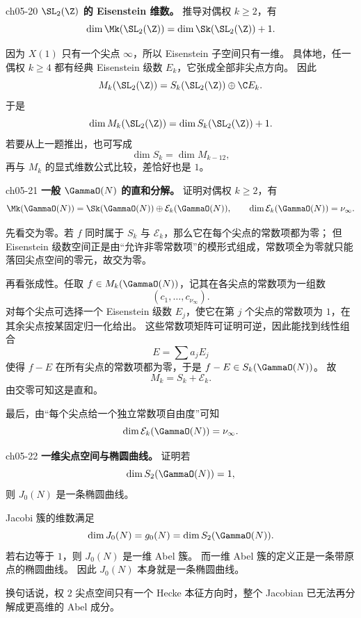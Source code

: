 \begin{problem}{ch05-20}
\textbf{$\SL_2(\Z)$ 的 Eisenstein 维数。}
推导对偶权 $k\ge2$，有
\[
\dim \Mk(\SL_2(\Z))=\dim \Sk(\SL_2(\Z))+1.
\]
\end{problem}
\begin{solution}
因为 $X(1)$ 只有一个尖点 $\infty$，所以 Eisenstein 子空间只有一维。
具体地，任一偶权 $k\ge 4$ 都有经典 Eisenstein 级数 $E_k$，它张成全部非尖点方向。
因此
\[
M_k(\SL_2(\Z))=S_k(\SL_2(\Z))\oplus \C E_k.
\]
于是
\[
\dim M_k(\SL_2(\Z))=\dim S_k(\SL_2(\Z))+1.
\]
若要从上一题推出，也可写成
\[
\dim S_k=\dim M_{k-12},
\]
再与 $M_k$ 的显式维数公式比较，差恰好也是 $1$。
\end{solution}

\begin{problem}{ch05-21}
\textbf{一般 $\GammaO(N)$ 的直和分解。}
证明对偶权 $k\ge2$，有
\[
\Mk(\GammaO(N))=\Sk(\GammaO(N))\oplus \mathcal E_k(\GammaO(N)),
\qquad
\dim \mathcal E_k(\GammaO(N))=\nu_\infty.
\]
\end{problem}
\begin{solution}
先看交为零。若 $f$ 同时属于 $S_k$ 与 $\mathcal E_k$，那么它在每个尖点的常数项都为零；
但 Eisenstein 级数空间正是由“允许非零常数项”的模形式组成，常数项全为零就只能落回尖点空间的零元，故交为零。

再看张成性。任取 $f\in M_k(\GammaO(N))$，记其在各尖点的常数项为一组数
\[
(c_1,\dots,c_{\nu_\infty}).
\]
对每个尖点可选择一个 Eisenstein 级数 $E_j$，使它在第 $j$ 个尖点的常数项为 $1$，在其余尖点按某固定归一化给出。
这些常数项矩阵可证明可逆，因此能找到线性组合
\[
E=\sum a_jE_j
\]
使得 $f-E$ 在所有尖点的常数项都为零，于是 $f-E\in S_k(\GammaO(N))$。
故
\[
M_k=S_k+\mathcal E_k.
\]
由交零可知这是直和。

最后，由“每个尖点给一个独立常数项自由度”可知
\[
\dim \mathcal E_k(\GammaO(N))=\nu_\infty.
\]
\end{solution}

\begin{problem}{ch05-22}
\textbf{一维尖点空间与椭圆曲线。}
证明若
\[
\dim S_2(\GammaO(N))=1,
\]
则 $J_0(N)$ 是一条椭圆曲线。
\end{problem}
\begin{solution}
Jacobi 簇的维数满足
\[
\dim J_0(N)=g_0(N)=\dim S_2(\GammaO(N)).
\]
若右边等于 $1$，则 $J_0(N)$ 是一维 Abel 簇。
而一维 Abel 簇的定义正是一条带原点的椭圆曲线。
因此 $J_0(N)$ 本身就是一条椭圆曲线。

换句话说，权 $2$ 尖点空间只有一个 Hecke 本征方向时，整个 Jacobian 已无法再分解成更高维的 Abel 成分。
\end{solution}

